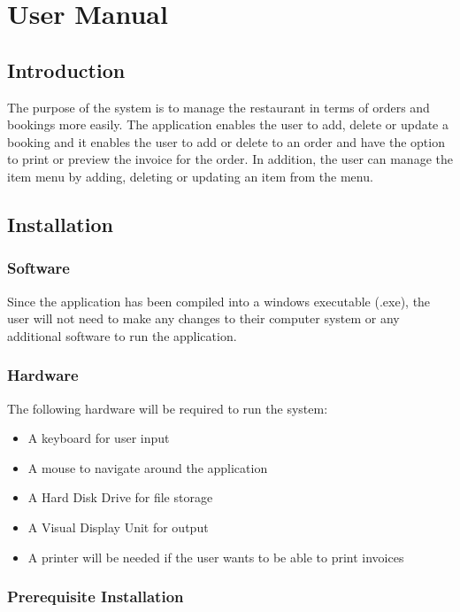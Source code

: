 \chapter{User Manual}

\section{Introduction}
The purpose of the system is to manage the restaurant in terms of orders and bookings more easily. The application enables the user to add, delete or update a booking and it enables the user to add or delete to an order and have the option to print or preview the invoice for the order. In addition, the user can manage the item menu by adding, deleting or updating an item from the menu.

\section{Installation}

\subsection{Software}
Since the application has been compiled into a windows executable (.exe), the user will not need to make any changes to their computer system or any additional software to run the application.

\subsection{Hardware}

The following hardware will be required to run the system:

\begin{itemize}

	\item A keyboard for user input
	\item A mouse to navigate around the application
	\item A Hard Disk Drive for file storage 
	\item A Visual Display Unit for output
	\item A printer will be needed if the user wants to be able to print invoices
	

\end{itemize}



\subsection{Prerequisite Installation}

